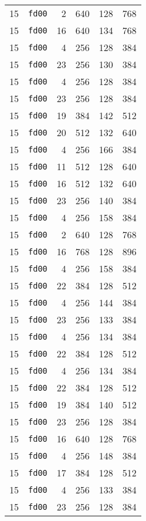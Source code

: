 \documentclass{article}
\begin{document}
\begin{table}[h!]
\begin{tabular}{llrrrl}
    15 & \texttt{fd00} & 2 & 640 & 128 & 768 \\
    15 & \texttt{fd00} & 16 & 640 & 134 & 768 \\
    15 & \texttt{fd00} & 4 & 256 & 128 & 384 \\
    15 & \texttt{fd00} & 23 & 256 & 130 & 384 \\
    15 & \texttt{fd00} & 4 & 256 & 128 & 384 \\
    15 & \texttt{fd00} & 23 & 256 & 128 & 384 \\
    15 & \texttt{fd00} & 19 & 384 & 142 & 512 \\
    15 & \texttt{fd00} & 20 & 512 & 132 & 640 \\
    15 & \texttt{fd00} & 4 & 256 & 166 & 384 \\
    15 & \texttt{fd00} & 11 & 512 & 128 & 640 \\
    15 & \texttt{fd00} & 16 & 512 & 132 & 640 \\
    15 & \texttt{fd00} & 23 & 256 & 140 & 384 \\
    15 & \texttt{fd00} & 4 & 256 & 158 & 384 \\
    15 & \texttt{fd00} & 2 & 640 & 128 & 768 \\
    15 & \texttt{fd00} & 16 & 768 & 128 & 896 \\
    15 & \texttt{fd00} & 4 & 256 & 158 & 384 \\
    15 & \texttt{fd00} & 22 & 384 & 128 & 512 \\
    15 & \texttt{fd00} & 4 & 256 & 144 & 384 \\
    15 & \texttt{fd00} & 23 & 256 & 133 & 384 \\
    15 & \texttt{fd00} & 4 & 256 & 134 & 384 \\
    15 & \texttt{fd00} & 22 & 384 & 128 & 512 \\
    15 & \texttt{fd00} & 4 & 256 & 134 & 384 \\
    15 & \texttt{fd00} & 22 & 384 & 128 & 512 \\
    15 & \texttt{fd00} & 19 & 384 & 140 & 512 \\
    15 & \texttt{fd00} & 23 & 256 & 128 & 384 \\
    15 & \texttt{fd00} & 16 & 640 & 128 & 768 \\
    15 & \texttt{fd00} & 4 & 256 & 148 & 384 \\
    15 & \texttt{fd00} & 17 & 384 & 128 & 512 \\
    15 & \texttt{fd00} & 4 & 256 & 133 & 384 \\
    15 & \texttt{fd00} & 23 & 256 & 128 & 384 \\

\end{tabular}
\end{table}
\end{document}
